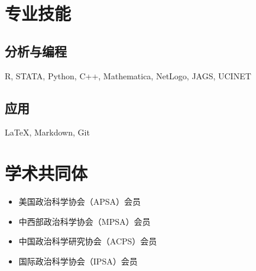 \documentclass[11pt,a4paper,]{awesome-cv}
\providecommand{\tightlist}{%
	\setlength{\itemsep}{0pt}\setlength{\parskip}{0pt}}
\begin{document}
\begin{cventries}
    \vspace{-4.0mm}
    \vspace{-4.0mm}
    \vspace{-4.0mm}
\end{cventries}

\hypertarget{ux4e13ux4e1aux6280ux80fd}{%
\section{专业技能}\label{ux4e13ux4e1aux6280ux80fd}}

\hypertarget{ux5206ux6790ux4e0eux7f16ux7a0b}{%
\subsection{\texorpdfstring{\textbf{分析与编程}}{分析与编程}}\label{ux5206ux6790ux4e0eux7f16ux7a0b}}

R, STATA, Python, C++, Mathematica, NetLogo, JAGS, UCINET

\hypertarget{ux5e94ux7528}{%
\subsection{\texorpdfstring{\textbf{应用}}{应用}}\label{ux5e94ux7528}}

LaTeX, Markdown, Git

\hypertarget{ux5b66ux672fux5171ux540cux4f53}{%
\section{学术共同体}\label{ux5b66ux672fux5171ux540cux4f53}}

\begin{itemize}
\tightlist
\item
  美国政治科学协会（APSA）会员
\item
  中西部政治科学协会（MPSA）会员
\item
  中国政治科学研究协会（ACPS）会员
\item
  国际政治科学协会（IPSA）会员
\end{itemize}


\label{LastPage}~
\end{document}
